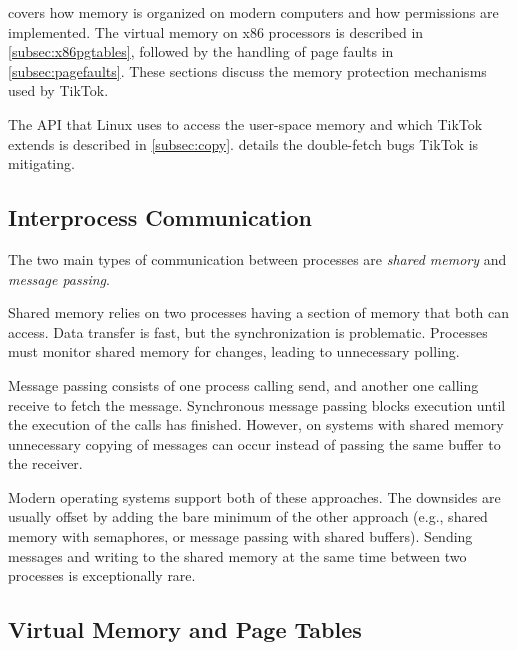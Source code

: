  covers how memory is organized on modern computers and how
permissions are implemented. The virtual memory on x86 processors is described
in \cref{subsec:x86pgtables}, followed by the handling of page faults in
\cref{subsec:pagefaults}. These sections discuss the memory protection
mechanisms used by TikTok.

The API that Linux uses to access the user-space memory and which TikTok extends is
described in \cref{subsec:copy}.  details the
double-fetch bugs TikTok is mitigating.

\subsection{Interprocess Communication}
\label{subsec:ipc}

The two main types of communication between processes are \emph{shared memory} 
and \emph{message passing}\cite{silberschatz2018operating}.


Shared memory relies on two processes having a section of memory that both can 
access. Data transfer is fast, but the synchronization is problematic. 
Processes must monitor shared memory for changes, leading to unnecessary
polling.

Message passing consists of one process calling send, and another one calling
receive to fetch the message. Synchronous message passing blocks execution until
the execution of the calls has finished. However, on systems with shared memory
unnecessary copying of messages can occur instead of passing the same buffer to
the receiver.

Modern operating systems support both of these approaches. The downsides are
usually offset by adding the  bare minimum of the other approach (e.g., shared
memory with semaphores, or message passing with shared buffers). Sending
messages and writing to the shared memory at the same time between two processes
is exceptionally rare.

\subsection{Virtual Memory and Page Tables} \label{subsec:vm}

